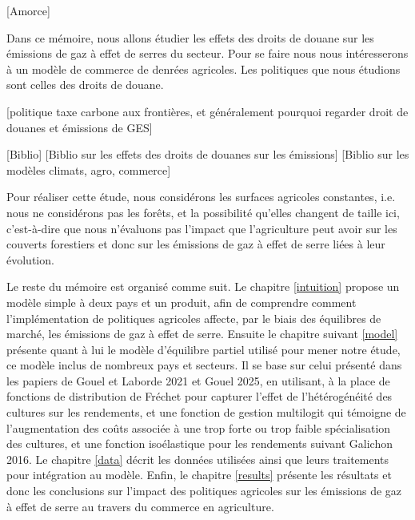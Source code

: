 [Amorce]

Dans ce mémoire, nous allons étudier les effets des droits de douane sur les émissions de gaz à effet de serres du secteur. Pour se faire nous nous intéresserons à un modèle de commerce de denrées agricoles. Les politiques que nous étudions sont celles des droits de douane.

    [politique taxe carbone aux frontières, et généralement pourquoi regarder droit de douanes et émissions de GES]

    [Biblio]
    [Biblio sur les effets des droits de douanes sur les émissions]
    [Biblio sur les modèles climats, agro, commerce]


Pour réaliser cette étude, nous considérons les surfaces agricoles constantes, i.e. nous ne considérons pas les forêts, et la possibilité qu’elles changent de taille ici, c’est-à-dire que nous n’évaluons pas l’impact que l’agriculture peut avoir sur les couverts forestiers et donc sur les émissions de gaz à effet de serre liées à leur évolution.

Le reste du mémoire est organisé comme suit. Le chapitre \ref{intuition} propose un modèle simple à deux pays et un produit, afin de comprendre comment l’implémentation de politiques agricoles affecte, par le biais des équilibres de marché, les émissions de gaz à effet de serre. Ensuite le chapitre suivant \ref{model} présente quant à lui le modèle d’équilibre partiel utilisé pour mener notre étude, ce modèle inclus de nombreux pays et secteurs. Il se base sur celui présenté dans les papiers de Gouel et Laborde 2021 et Gouel 2025, en utilisant, à la place de fonctions de distribution de Fréchet pour capturer l’effet de l’hétérogénéité des cultures sur les rendements, et une fonction de gestion multilogit qui témoigne de l’augmentation des coûts associée à une trop forte ou trop faible spécialisation des cultures, et une fonction isoélastique pour les rendements suivant Galichon 2016. Le chapitre \ref{data} décrit les données utilisées ainsi que leurs traitements pour intégration au modèle. Enfin, le chapitre \ref{results} présente les résultats et donc les conclusions sur l’impact des politiques agricoles sur les émissions de gaz à effet de serre au travers du commerce en agriculture.

